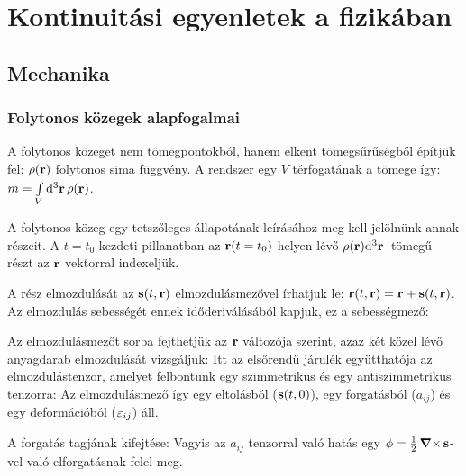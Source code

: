 \chapter{Kontinuitási egyenletek a fizikában}
  
 \section{Mechanika}
  
  \subsection{Folytonos közegek alapfogalmai}
   
   A folytonos közeget nem tömegpontokból, hanem elkent tömegsűrűségből építjük fel: $\rho(\mathbf{r})$ folytonos sima függvény. A rendszer egy $V$ térfogatának a tömege így: $m=\int\limits_{V}^{}\mathrm{d}^3\mathbf{r}\,\rho(\mathbf{r})$. 
   
   A folytonos közeg egy tetszőleges állapotának leírásához meg kell jelölnünk annak részeit. A $t=t_0$ kezdeti pillanatban az $\mathbf{r}(t=t_0)$ helyen lévő $\rho(\mathbf{r})\mathrm{d}^3\mathbf{r}\,$ tömegű részt az $\mathbf{r}$ vektorral indexeljük.
   
   A rész elmozdulását az $\mathbf{s}(t,\mathbf{r})$ elmozdulásmezővel írhatjuk le: $\mathbf{r}(t,\mathbf{r})=\mathbf{r}+\mathbf{s}(t,\mathbf{r})$. Az elmozdulás sebességét ennek időderiválásából kapjuk, ez a sebességmező: 
    
   Az elmozdulásmezőt sorba fejthetjük az $\mathbf{r}$ változója szerint, azaz két közel lévő anyagdarab elmozdulását vizsgáljuk:
   Itt az elsőrendű járulék együtthatója az elmozdulástenzor, amelyet felbontunk egy szimmetrikus és egy antiszimmetrikus tenzorra: 
   Az elmozdulásmező így egy eltolásból ($\mathbf{s}(t,0)$), egy forgatásból ($a_{ij}$) és egy deformációból ($\varepsilon_{ij}$) áll.
   
   A forgatás tagjának kifejtése: 
   Vagyis az $a_{ij}$ tenzorral való hatás egy $\phi=\frac{1}{2}\mathop{\boldsymbol{\nabla}\times}\nolimits{\mathbf{s}}$-vel való elforgatásnak felel meg. 
   
